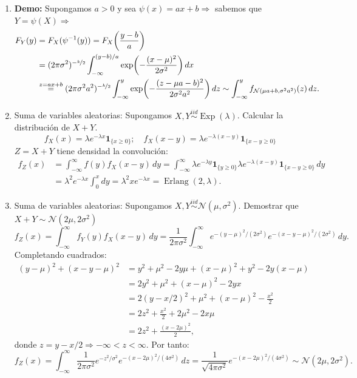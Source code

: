 \begin{enumerate}
  \item \textbf{Demo:} Supongamos $a > 0$ y sea $\psi(x) = ax + b \Rightarrow$ sabemos que $Y = \psi(X) \Rightarrow$
        \begin{align*}
          F_Y(y) &= F_X(\psi^{-1}(y)) = F_X\!\left(\frac{y-b}{a}\right) \\
                 & = (2\pi\sigma^2)^{-\nicefrac{k}{2}} \int_{-\infty}^{(y-b)/a} \exp\!\left(-\frac{(x-\mu)^2}{2\sigma^2}\right) dx \\
                 & \overset{z=ax+b}{=} (2\pi\sigma^2 a^2)^{-\nicefrac{k}{2}} \int_{-\infty}^y \exp\!\left(-\frac{(z - \mu a - b)^2}{2\sigma^2 a^2}\right) dz \sim \int_{-\infty}^y f_{\mathcal{N}(\mu a + b, \sigma^2 a^2)}(z)\,dz.
        \end{align*}

  \item Suma de variables aleatorias: Supongamos $X,Y\overset{iid}{\sim} \operatorname{Exp}(\lambda)$. Calcular la distribuci\'on de $X+Y$.
  $$f_X(x) = \lambda e^{-\lambda x}\mathbf{1}_{\{x \ge 0\}}; \quad f_X(x - y) = \lambda e^{-\lambda(x-y)}\mathbf{1}_{\{x - y \ge 0\}}$$
  $Z = X + Y$ tiene densidad la convolución:
        \begin{align*}            
          f_Z(x) &  = \int_{-\infty}^\infty f(y) f_X(x - y)\,dy = \int_{-\infty}^\infty \lambda e^{-\lambda y}\mathbf{1}_{\{y \ge 0\}} \lambda e^{-\lambda(x-y)}\mathbf{1}_{\{x - y \ge 0\}}\,dy \\ & = \lambda^2 e^{-\lambda x}\int_0^x dy = \lambda^2 x e^{-\lambda x} = \operatorname{Erlang}(2, \lambda).    \end{align*}

  \item Suma de variables aleatorias: Supongamos $X,Y\overset{iid}{\sim} \mathcal{N}(\mu, \sigma^2)$. Demostrar que $X+Y \sim \mathcal{N}(2\mu, 2\sigma^2)$
        \[
          f_Z(x) = \int_{-\infty}^\infty f_Y(y) f_X(x - y)\,dy = \frac{1}{2\pi\sigma^2}\int_{-\infty}^\infty e^{-(y-\mu)^2/(2\sigma^2)} e^{-(x - y - \mu)^2/(2\sigma^2)}\,dy.
        \]
        Completando cuadrados:
        \begin{align*}
          (y-\mu)^2 + (x-y-\mu)^2 & = y^2 + \mu^2 - 2y\mu + (x-\mu)^2 + y^2 - 2y(x-\mu) \\ & = 2y^2 + \mu^2 + (x-\mu)^2 - 2yx \\ & = 2(y - x/2)^2 + \mu^2 + (x-\mu)^2 - \frac{x^2}{2} \\ & = 2z^2 + \frac{x^2}{2} + 2\mu^2 - 2x\mu \\ & =  2z^2 + \frac{(x - 2\mu)^2}{2},
        \end{align*}
        donde $z = y - x/2 \Rightarrow -\infty < z < \infty$. Por tanto:
        \[
          f_Z(x) = \int_{-\infty}^\infty \frac{1}{2\pi\sigma^2} e^{-z^2/\sigma^2} e^{-(x - 2\mu)^2/(4\sigma^2)}\,dz = \frac{1}{\sqrt{4\pi\sigma^2}} e^{-(x - 2\mu)^2/(4\sigma^2)} \sim \mathcal{N}(2\mu, 2\sigma^2).
        \]


\end{enumerate}
